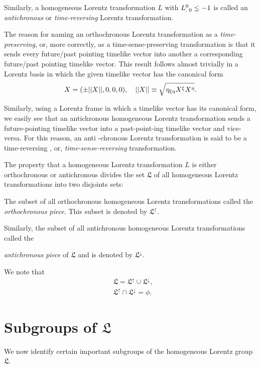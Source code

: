 \begin{small}
\dfn Similarly, a homogeneous Lorentz transformation $L$ 
with ${{L}^{0}_{.\;0}}\leq -1$ is called an 
\textsl{antichronous} or \textsl{time-reversing} Lorentz 
transformation.

The reason for naming an orthochronous Lorentz  
transformation as a \textsl{time-preserving}, or, more 
correctly, as a time-sense-preserving transformation is 
that it sends every {future/past pointing} timelike vector 
into another a corresponding {future/past pointing} 
timelike vector. This result follows almost trivially in a 
Lorentz  basis in which the given timelike vector has the 
canonical form
\begin{align*}
X=(\pm||X||,0,0,0),  \quad  ||X||\equiv  
\sqrt{{\eta}_{{\xi}{\eta}} X^{{\xi}} X^{{\eta}}}.                       
\end{align*}

Similarly, using a Lorentz frame in which a timelike vector 
has its canonical form, we easily see that an antichronous 
homogeneous Lorentz transformation sends a 
{future-pointing} timelike vector into a {past-point-\break ing}  
timelike vector and vice-versa. For this reason, an anti  
-chronous Lorentz transformation is said to be a 
time-reversing , or, \textsl{time-sense-reversing} 
transformation.

The property that a homogeneous Lorentz transformation  
$L$ is either orthochronous or antichronous divides the set 
$\mathfrak{L}$ of all homogeneous Lorentz transformations 
into two disjoints sets: 

The subset of all 
orthochronous homogeneous Lorentz transformations called 
the \textsl{orthochronous piece}. This subset  is denoted 
by $\mathfrak{L}^\uparrow$. 

Similarly, the subset of all 
antichronous homogeneous Lorentz transformations called the 
 
\textsl{antichronous piece} of $\mathfrak{L}$ and is  
denoted by $\mathfrak{L}^\downarrow $. 

We note that 
\begin{align*}
&\mathfrak{L}=\mathfrak{L}^\uparrow \cup
\mathfrak{L}^\downarrow,\\
&\mathfrak{L}^\uparrow \cap
\mathfrak{L}^\downarrow =\phi.
\end{align*}

\section{Subgroups of {$\mathfrak{L}$}{}} 
We now identify certain important subgroups of the 
homogeneous Loren\break tz group $\mathfrak{L}$.


\end{small}
